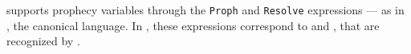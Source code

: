 \Zoo supports prophecy variables through the \texttt{Proph} and \texttt{Resolve} expressions --- as in \HeapLang, the canonical \Iris language.
In \OCaml, these expressions correspond to  and , that are recognized by \ocamlToZoo.

